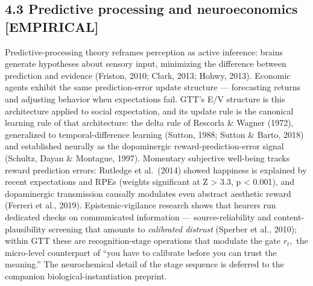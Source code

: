\documentclass[
]{article}
\begin{document}
\subsection{4.3 Predictive processing and neuroeconomics
{[}EMPIRICAL{]}}\label{predictive-processing-and-neuroeconomics-empirical}

Predictive-processing theory reframes perception as active inference:
brains generate hypotheses about sensory input, minimizing the
difference between prediction and evidence (Friston, 2010; Clark, 2013;
Hohwy, 2013). Economic agents exhibit the same prediction-error update
structure --- forecasting returns and adjusting behavior when
expectations fail. GTT's E/V structure is this architecture applied to
social expectation, and its update rule is the canonical learning rule
of that architecture: the delta rule of Rescorla \& Wagner (1972),
generalized to temporal-difference learning (Sutton, 1988; Sutton \&
Barto, 2018) and established neurally as the dopaminergic
reward-prediction-error signal (Schultz, Dayan \& Montague, 1997).
Momentary subjective well-being tracks reward prediction errors:
Rutledge et al.~(2014) showed happiness is explained by recent
expectations and RPEs (weights significant at Z \textgreater{} 3.3, p
\textless{} 0.001), and dopaminergic transmission causally modulates
even abstract aesthetic reward (Ferreri et al., 2019).
Epistemic-vigilance research shows that hearers run dedicated checks on
communicated information --- source-reliability and content-plausibility
screening that amounts to \emph{calibrated distrust} (Sperber et al.,
2010); within GTT these are recognition-stage operations that modulate
the gate \(r_t,\) the micro-level counterpart of ``you have to calibrate
before you can trust the meaning.'' The neurochemical detail of the
stage sequence is deferred to the companion biological-instantiation
preprint.
\end{document}
